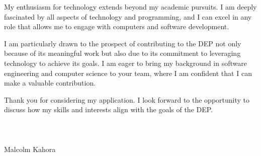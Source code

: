 \documentclass[letterpaper,11pt]{article}
\begin{document}

My enthusiasm for technology extends beyond my academic pursuits. I am deeply fascinated by all aspects of technology and programming, and I can excel in any role that allows me to engage with computers and software development.


I am particularly drawn to the prospect of contributing to the DEP not only because of its meaningful work but also due to its commitment to leveraging technology to achieve its goals. I am eager to bring my background in software engineering and computer science to your team, where I am confident that I can make a valuable contribution.


Thank you for considering my application. I look forward to the opportunity to discuss how my skills and interests align with the goals of the DEP. \\
\\
\\
\\
\vspace{50pt}
Malcolm Kahora
\end{document}
